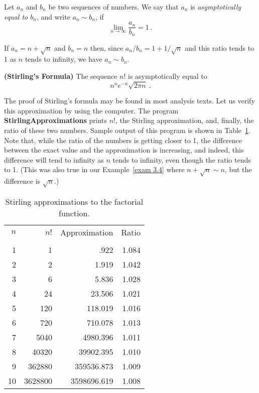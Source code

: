 \begin{definition}\label{def 3.2} Let $a_n$ and $b_n$ be two sequences of numbers.  We
say that $a_n$ is {\em asymptotically equal to $b_n$}, and 
write $a_n \sim b_n$, if
$$
\lim_{n \to \infty} \frac{a_n}{b_n} = 1\ .
$$
\end{definition}
\begin{example}\label{exam 3.4} If $a_n = n + \sqrt n$ and $b_n = n$ then, since
$a_n/b_n = 1 + 1/\sqrt n$ and this ratio tends to 1 as $n$ tends to infinity, we have
$a_n \sim b_n$.
\end{example}

\begin{theorem}{\bf (Stirling's Formula)}\label{thm 3.3} The 
sequence $n!$ is asymptotically equal to
$$ n^ne^{-n}\sqrt{2\pi n}\ .
$$
\end{theorem}

The proof of Stirling's formula may be found in most analysis texts.  Let us verify
this approximation by using the computer.  The program {\bf
StirlingApproximations} prints
$n!$, the Stirling approximation, and, finally, the ratio of these two numbers.  Sample
output of this program is shown in Table~\ref{table 3.26}.  Note that, while the ratio of the
numbers is getting closer to 1, the difference between the exact value and the approximation is
increasing, and indeed, this difference will tend to infinity as $n$ tends to infinity, even
though the ratio tends to 1.  (This was also true in our Example~\ref{exam 3.4}  where $n +
\sqrt n \sim n$, but the difference is $\sqrt n$.)

\begin{table}
\centering
\begin{tabular}{rrrr} $n$     & $n!$ &Approximation &Ratio \\
\\ 
1 & 1 & .922 & 1.084\\
2 & 2  & 1.919 & 1.042\\
3 & 6  & 5.836 & 1.028\\
4 & 24 & 23.506 & 1.021\\
5 & 120 & 118.019 & 1.016\\
6 & 720 & 710.078 & 1.013\\
7 & 5040 & 4980.396 & 1.011\\
8 & 40320 & 39902.395 & 1.010\\
9 & 362880 & 359536.873 & 1.009\\
10 & 3628800 & 3598696.619 & 1.008\\

\end{tabular}
\caption{Stirling approximations to the factorial function.}
\label{table 3.26}
\end{table}

